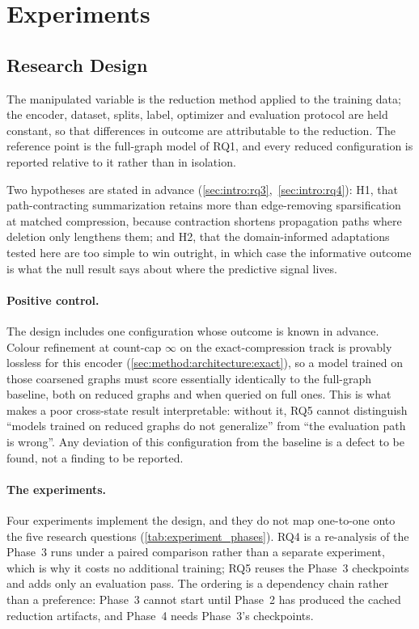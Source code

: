 \section{Experiments}
\label{sec:method:experiment}

\subsection{Research Design}
\label{sec:method:experiment:design}
The manipulated variable is the reduction method applied to the training data; the encoder, dataset, splits, label,
optimizer and evaluation protocol are held constant, so that differences in outcome are
attributable to the reduction. The reference point is the full-graph model of RQ1, and every
reduced configuration is reported relative to it rather than in isolation.

Two hypotheses are stated in advance (\ref{sec:intro:rq3},~\ref{sec:intro:rq4}): H1, that
path-contracting summarization retains more than edge-removing sparsification at matched
compression, because contraction shortens propagation paths where deletion only lengthens
them; and H2, that the domain-informed adaptations tested here are too simple to win
outright, in which case the informative outcome is what the null result says about where the
predictive signal lives.

\paragraph{Positive control.}
The design includes one configuration whose outcome is known in advance. Colour refinement at
count-cap $\infty$ on the exact-compression track is provably lossless for this encoder
(\ref{sec:method:architecture:exact}), so a model trained on those coarsened graphs must
score essentially identically to the full-graph baseline, both on reduced graphs and when
queried on full ones. This is what makes a poor cross-state result interpretable: without it,
RQ5 cannot distinguish ``models trained on reduced graphs do not generalize'' from ``the
evaluation path is wrong''. Any deviation of this configuration from the baseline is a defect
to be found, not a finding to be reported.

\paragraph{The experiments.}
\label{sec:method:experiment:phases}
Four experiments implement the design, and they do not map one-to-one onto the five research
questions (\ref{tab:experiment_phases}). RQ4 is a re-analysis of the Phase~3 runs under a
paired comparison rather than a separate experiment, which is why it costs no additional
training; RQ5 reuses the Phase~3 checkpoints and adds only an evaluation pass. The ordering
is a dependency chain rather than a preference: Phase~3 cannot start until Phase~2 has
produced the cached reduction artifacts, and Phase~4 needs Phase~3's checkpoints.


